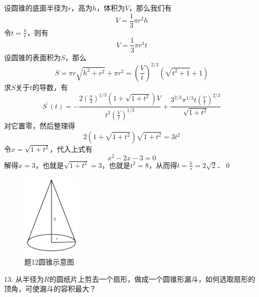 \solve 设圆锥的底面半径为$r$，高为$h$，体积为$V$，那么我们有
\begin{equation}
    V = \frac{1}{3} \pi r^2 h 
\end{equation}
令$t = \displaystyle\frac{h}{r}$，则有
\begin{equation}
    V = \frac{1}{3} \pi r^3 t
\end{equation}
设圆锥的表面积为$S$，那么
\begin{equation}
    S = \pi r \sqrt{h^2 + r^2} + \pi r^2 = \left(\frac{V}{t}\right)^{2/3} \left(\sqrt{t^2+1} + 1\right)
\end{equation}
求$S$关于$t$的导数，有
\begin{equation}
    S^{\prime}(t) = -\frac{2 \left(\displaystyle\frac{\pi}{3}\right)^{1/3}\left(1+\sqrt{1+t^2}\right)V}{t^2 \left(\displaystyle\frac{V}{t}\right)^{1/3}} + \frac{3^{2/3} \pi^{1/3} t \left(\displaystyle\frac{V}{t}\right)^{2/3}}{\sqrt{1+t^2}}
\end{equation}
对它置零，然后整理得
\begin{equation}
    2 \left(1+\sqrt{1+t^2}\right)\sqrt{1+t^2}=3t^2
\end{equation}
令$x = \sqrt{1+t^2}$，代入上式有
\begin{equation}
    x^2 - 2x - 3 = 0
\end{equation}
解得$x = 3$，也就是$\sqrt{1+t^2} = 3$，也就是$t^2 = 8$，从而得$t = \displaystyle\frac{h}{r} = 2\sqrt{2}$．\qed\bigskip

\begin{figure}[H]
    \centering
    \includegraphics[width=0.25\textwidth]{chapter3/cone.png}
    \caption{题12圆锥示意图}
\end{figure}

13. 从半径为$R$的圆纸片上剪去一个扇形，做成一个圆锥形漏斗，如何选取扇形的顶角，可使漏斗的容积最大？

